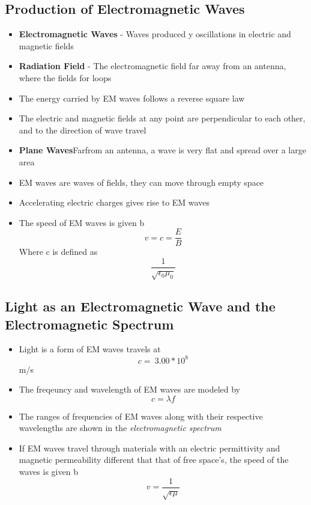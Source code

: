 \subsection{Production of Electromagnetic Waves}
\begin{itemize}
    \item \textbf{Electromagnetic Waves} - Waves produced y oscillations in electric and magnetic fields
    \item \textbf{Radiation Field} - The electromagnetic field far away from an antenna, where the fields for loops
    \item The energy carried by EM waves follows a reverse square law
    \item The electric and magnetic fields at any point are perpendicular to each other, and to the direction of wave travel
    \item \textbf{Plane Waves}Farfrom an antenna, a wave is very flat and spread over a large area
    \item EM waves are waves of fields, they can move through empty space
    \item Accelerating electric charges gives rise to EM waves
    \item The speed of EM waves is given b \[v=c=\frac{E}{B}\] Where c is defined as \[\frac{1}{\sqrt{\epsilon_0\mu_0}}\]
\end{itemize}

\subsection{Light as an Electromagnetic Wave and the Electromagnetic Spectrum}
\begin{itemize}
    \item Light is a form of EM waves travels at \[c=~3.00*10^8\]m/s
    \item The freqeuncy and wavelength of EM waves are modeled by \[c=\lambda f\]
    \item The ranges of frequencies of EM waves along with their respective wavelengths are shown in the \emph{electromagnetic spectrum}
    \item If EM waves travel through materials with an electric permittivity and magnetic permeability different that that of free space's, the speed of the waves is given b \[v=\frac{1}{\sqrt{\epsilon\mu}}\]
\end{itemize}

